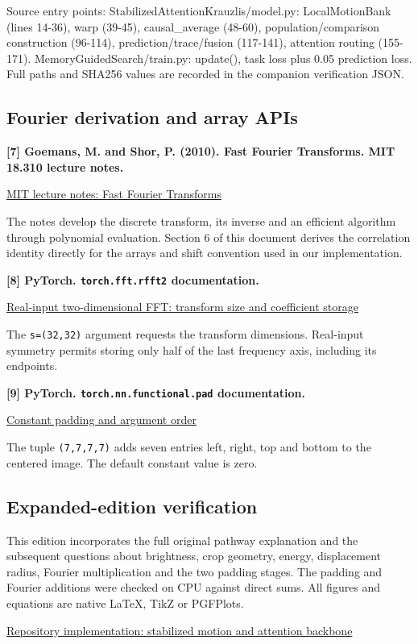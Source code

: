 \documentclass[11pt,letterpaper]{article}
\begin{document}
{
\small\color{muted} Source entry points: StabilizedAttentionKrauzlis/\allowbreak{}model.py: LocalMotionBank (lines 14-36), warp (39-45), causal\_average (48-60), population/\allowbreak{}comparison construction (96-114), prediction/\allowbreak{}trace/\allowbreak{}fusion (117-141), attention routing (155-171). MemoryGuidedSearch/\allowbreak{}train.py: update(), task loss plus 0.05 prediction loss. Full paths and SHA256 values are recorded in the companion verification JSON.\par}


\clearpage
\subsection*{Fourier derivation and array APIs}
\textbf{[7] Goemans, M. and Shor, P. (2010). Fast Fourier Transforms. MIT 18.310 lecture notes.}

\href{https://math.mit.edu/~shor/18.310/fft-notes.pdf}{MIT lecture notes: Fast Fourier Transforms}

The notes develop the discrete transform, its inverse and an efficient algorithm through polynomial evaluation. Section 6 of this document derives the correlation identity directly for the arrays and shift convention used in our implementation.

\textbf{[8] PyTorch. \texttt{torch.fft.rfft2} documentation.}

\href{https://docs.pytorch.org/docs/2.14/generated/torch.fft.rfft2.html}{Real-input two-dimensional FFT: transform size and coefficient storage}

The \texttt{s=(32,32)} argument requests the transform dimensions. Real-input symmetry permits storing only half of the last frequency axis, including its endpoints.

\textbf{[9] PyTorch. \texttt{torch.nn.functional.pad} documentation.}

\href{https://docs.pytorch.org/docs/2.14/generated/torch.nn.functional.pad.html}{Constant padding and argument order}

The tuple \texttt{(7,7,7,7)} adds seven entries left, right, top and bottom to the centered image. The default constant value is zero.

\subsection*{Expanded-edition verification}
This edition incorporates the full original pathway explanation and the subsequent questions about brightness, crop geometry, energy, displacement radius, Fourier multiplication and the two padding stages. The padding and Fourier additions were checked on CPU against direct sums. All figures and equations are native LaTeX, TikZ or PGFPlots.

\href{https://github.com/jomorg1724/VisualAttentionWorkingMemory/blob/a65838909ee2e7ac169b1f37fc982a2f493c36ed/SecondPass/StabilizedAttentionKrauzlis/model.py}{Repository implementation: stabilized motion and attention backbone}
\end{document}
